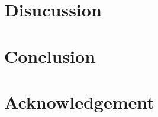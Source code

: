\documentclass[a4paper, dvipdfmx]{report}
\begin{document}
\chapter{Disucussion}

\chapter{Conclusion}

\chapter*{Acknowledgement}


\newpage
{}
\renewcommand{\bibname}{References}






\end{document}
